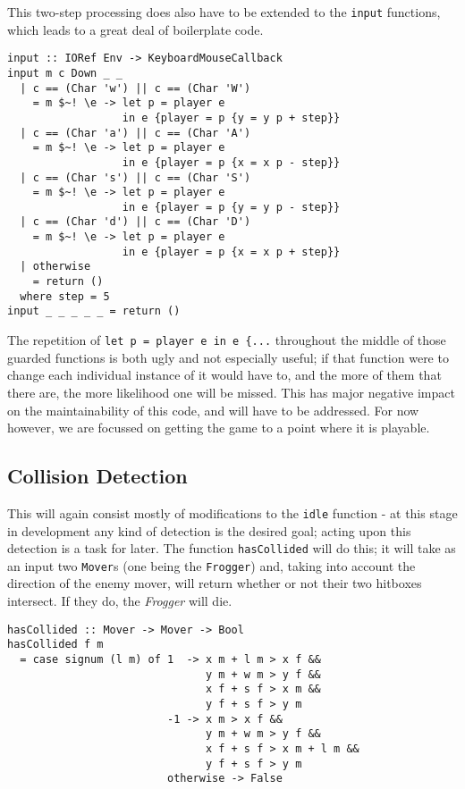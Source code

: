 \documentclass[12pt, a4paper]{report}
\begin{document}
This two-step processing does also have to be extended to the \verb|input| functions, which leads to a great deal of boilerplate code.

\begin{lstlisting}
input :: IORef Env -> KeyboardMouseCallback
input m c Down _ _
  | c == (Char 'w') || c == (Char 'W')
    = m $~! \e -> let p = player e
                  in e {player = p {y = y p + step}}
  | c == (Char 'a') || c == (Char 'A')
    = m $~! \e -> let p = player e
                  in e {player = p {x = x p - step}}
  | c == (Char 's') || c == (Char 'S')
    = m $~! \e -> let p = player e
                  in e {player = p {y = y p - step}}
  | c == (Char 'd') || c == (Char 'D')
    = m $~! \e -> let p = player e
                  in e {player = p {x = x p + step}}
  | otherwise
    = return ()
  where step = 5
input _ _ _ _ _ = return ()
\end{lstlisting}

The repetition of \verb|let p = player e in e {...| throughout the middle of those guarded functions is both ugly and not especially useful; if that function were to change each individual instance of it would have to, and the more of them that there are, the more likelihood one will be missed.
This has major negative impact on the maintainability of this code, and will have to be addressed.
For now however, we are focussed on getting the game to a point where it is playable.

\subsection{Collision Detection}

This will again consist mostly of modifications to the \verb|idle| function - at this stage in development any kind of detection is the desired goal; acting upon this detection is a task for later.
The function \verb|hasCollided| will do this; it will take as an input two \verb|Mover|s (one being the \verb|Frogger|) and, taking into account the direction of the enemy mover, will return whether or not their two hitboxes intersect.
If they do, the \textit{Frogger} will die.

\begin{lstlisting}
hasCollided :: Mover -> Mover -> Bool
hasCollided f m
  = case signum (l m) of 1  -> x m + l m > x f &&
                               y m + w m > y f &&
                               x f + s f > x m &&
                               y f + s f > y m
                         -1 -> x m > x f &&
                               y m + w m > y f &&
                               x f + s f > x m + l m &&
                               y f + s f > y m
                         otherwise -> False
\end{lstlisting}
\end{document}
